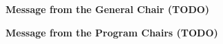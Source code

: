 \documentclass[11pt]{article}
\begin{document}
\begin{center}
  {\Large \bf Message from the General Chair (TODO)}
\end{center}

\vspace*{0.5cm}

\pagebreak

\begin{center}
  {\Large \bf Message from the Program Chairs (TODO)}
\end{center}

\vspace*{0.5cm}
\end{document}
